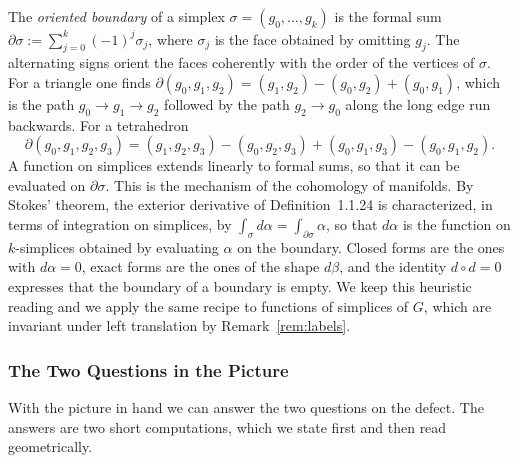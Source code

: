 \begin{remark}\label{rem:boundary-stokes}
	The \emph{oriented boundary} of a simplex $\sigma=(g_0,\dots,g_k)$ is the formal sum $\partial\sigma:=\sum_{j=0}^k(-1)^j\sigma_j$, where $\sigma_j$ is the face obtained by omitting $g_j$. The alternating signs orient the faces coherently with the order of the vertices of $\sigma$. For a triangle one finds $\partial(g_0,g_1,g_2)=(g_1,g_2)-(g_0,g_2)+(g_0,g_1)$, which is the path $g_0\to g_1\to g_2$ followed by the path $g_2\to g_0$ along the long edge run backwards. For a tetrahedron
	\begin{equation*}
		\partial(g_0,g_1,g_2,g_3)=(g_1,g_2,g_3)-(g_0,g_2,g_3)+(g_0,g_1,g_3)-(g_0,g_1,g_2).
	\end{equation*}
	A function on simplices extends linearly to formal sums, so that it can be evaluated on $\partial\sigma$. This is the mechanism of the cohomology of manifolds. By Stokes' theorem, the exterior derivative of Definition~1.1.24 is characterized, in terms of integration on simplices, by $\int_\sigma d\alpha=\int_{\partial\sigma}\alpha$, so that $d\alpha$ is the function on $k$-simplices obtained by evaluating $\alpha$ on the boundary. Closed forms are the ones with $d\alpha=0$, exact forms are the ones of the shape $d\beta$, and the identity $d\circ d=0$ expresses that the boundary of a boundary is empty. We keep this heuristic reading and we apply the same recipe to functions of simplices of $G$, which are invariant under left translation by Remark~\ref{rem:labels}.
\end{remark}

\subsubsection*{The Two Questions in the Picture}

With the picture in hand we can answer the two questions on the defect. The answers are two short computations, which we state first and then read geometrically.

